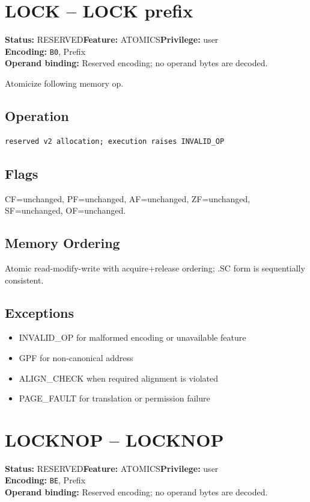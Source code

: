 \documentclass[10pt]{article}
\begin{document}
\section{LOCK -- LOCK prefix}
\textbf{Status:} RESERVED\quad \textbf{Feature:} ATOMICS\quad \textbf{Privilege:} user\\
\textbf{Encoding:} \texttt{B0}, Prefix\\
\textbf{Operand binding:} Reserved encoding; no operand bytes are decoded.

Atomicize following memory op.

\subsection*{Operation}
\begin{lstlisting}
reserved v2 allocation; execution raises INVALID_OP
\end{lstlisting}
\subsection*{Flags}
CF=unchanged, PF=unchanged, AF=unchanged, ZF=unchanged, SF=unchanged, OF=unchanged.
\subsection*{Memory Ordering}
Atomic read-modify-write with acquire+release ordering; .SC form is sequentially consistent.
\subsection*{Exceptions}
\begin{itemize}
\item INVALID\_OP for malformed encoding or unavailable feature
\item GPF for non-canonical address
\item ALIGN\_CHECK when required alignment is violated
\item PAGE\_FAULT for translation or permission failure
\end{itemize}
\clearpage

\section{LOCKNOP -- LOCKNOP}
\textbf{Status:} RESERVED\quad \textbf{Feature:} ATOMICS\quad \textbf{Privilege:} user\\
\textbf{Encoding:} \texttt{BE}, Prefix\\
\textbf{Operand binding:} Reserved encoding; no operand bytes are decoded.
\end{document}

